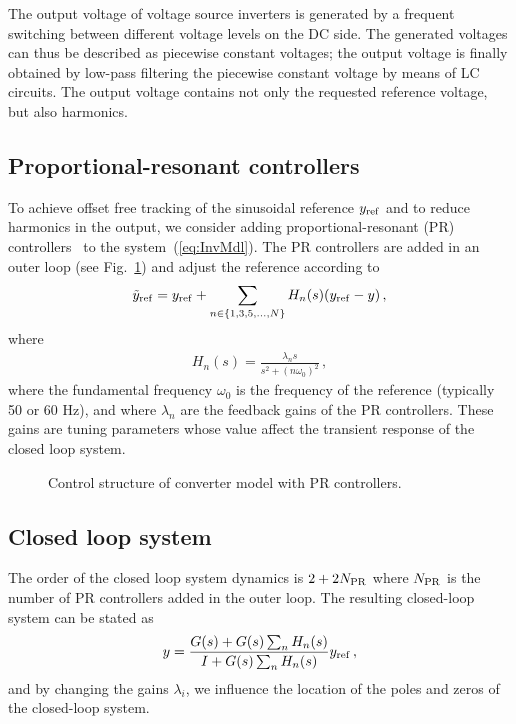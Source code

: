 \documentclass[conference,10pt]{IEEEtran}
\begin{document}
The output voltage of voltage source inverters is generated by a frequent switching between different voltage levels on the DC side. The generated voltages can thus be described as piecewise constant voltages; the output voltage is finally obtained by low-pass filtering the piecewise constant voltage by means of LC circuits. The output voltage contains not only the requested reference voltage, but also harmonics.

\subsection{Proportional-resonant controllers}

To achieve offset free tracking of the sinusoidal reference $y_{\rm ref}$ and to reduce harmonics in the output, we consider adding proportional-resonant (PR) controllers~\cite{fukuda2001novel} to the system~(\ref{eq:InvMdl}).
The PR controllers are added in an outer loop (see Fig.~\ref{fig:ControlStructure}) and adjust the reference according to
\begin{align*}
\tilde{y}_{\rm ref} = y_{\rm ref} + \sum_{n\in\{1,3,5,\dots, N\}}H_n(s)(y_{\rm ref}-y)\,,
\end{align*}
where
\begin{align*}
H_n(s) = \frac{\lambda_ns}{s^2 + (n\omega_0)^2}\,,
\end{align*}
where the fundamental frequency $\omega_0$ is the frequency of the reference (typically 50 or 60 Hz), and where $\lambda_n$ are the feedback gains of the PR controllers. These gains are tuning parameters whose value affect the transient response of the closed loop system.

\begin{figure}[!h]
\centering

\caption{Control structure of converter model with PR controllers.}
\label{fig:ControlStructure}
\end{figure}


\subsection{Closed loop system}

The order of the closed loop system dynamics is $2+2N_{\rm PR}$ where $N_{\rm PR}$ is the number of PR controllers added in the outer loop. The resulting closed-loop system can be stated as
\begin{align}\label{eq:ClosedLoopTF}
  y = \frac{G(s) + G(s) \sum_n H_n(s)}{I + G(s) \sum_n H_n(s)} y_{\rm ref}\,,
\end{align}
and by changing the gains $\lambda_i$, we influence the location of the poles and zeros of the closed-loop system.
\end{document}
